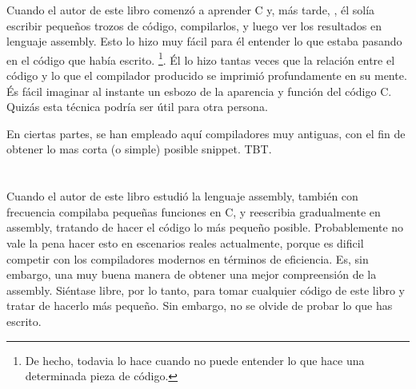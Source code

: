 \mysection{\ESph{}}

Cuando el autor de este libro comenzó a aprender C y, más tarde, \Cpp, él solía escribir pequeños trozos de código, compilarlos, 
y luego ver los resultados en lenguaje assembly. Esto lo hizo muy fácil para él entender lo que estaba pasando en el código que había escrito.
\footnote{De hecho, todavia lo hace cuando no puede entender lo que hace una determinada pieza de código.}. 
Él lo hizo tantas veces que la relación entre el código \CCpp y lo que el compilador producido se imprimió profundamente en su mente. 
És fácil imaginar al instante un esbozo de la aparencia y función del código C. 
Quizás esta técnica podría ser útil para otra persona.


En ciertas partes, se han empleado aquí compiladores muy antiguas, con el fin de obtener lo mas corta (o simple) posible snippet.
\ac{TBT}.
\section*{\Exercises}

Cuando el autor de este libro estudió la lenguaje assembly, también con frecuencia compilaba pequeñas funciones en C, y reescribia gradualmente en assembly, tratando de hacer el código lo más pequeño posible.
Probablemente no vale la pena hacer esto en escenarios reales actualmente, 
porque es dificil competir con los compiladores modernos en términos de eficiencia. Es, sin embargo, una muy buena manera de obtener una mejor compreensión de la assembly.
Siéntase libre, por lo tanto, para tomar cualquier código de este libro y tratar de hacerlo más pequeño.
Sin embargo, no se olvide de probar lo que has escrito.

